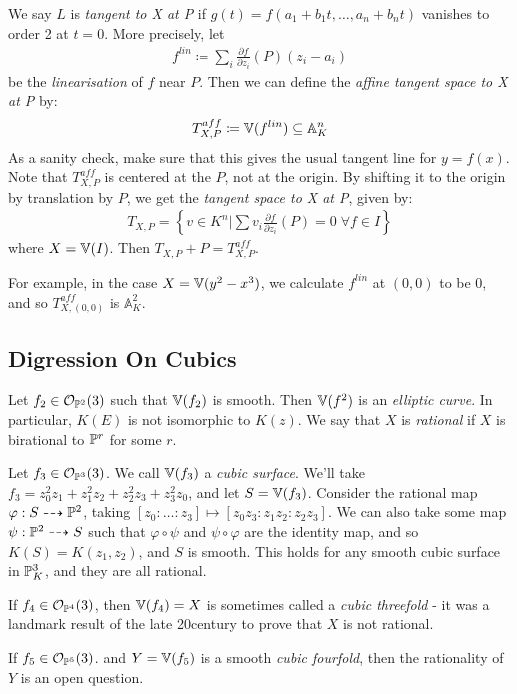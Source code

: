 \documentclass[10pt,a4paper,rgb]{article}
\newcommand{\A}{\mathbb{A}}
\begin{document}
We say $L$ is \emph{tangent to X at P} if $g(t) = f(a_1+b_1t, \ldots, a_n+b_nt)$ vanishes to order 2 at $t=0$. More precisely, let
\begin{align*}
f^{lin} \coloneqq \sum_i \frac{\partial f}{\partial z_i}(P)(z_i-a_i)
\end{align*}
be the \emph{linearisation} of $f$ near $P$. Then we can define the \emph{affine tangent space to X at P} by:
\begin{align*}
T_{X,P}^{aff} \coloneqq \V(f^{lin}) \subseteq \A_K^n
\end{align*}
As a sanity check, make sure that this gives the usual tangent line for $y=f(x)$. Note that $T^{aff}_{X,P}$ is centered at the $P$, not at the origin. By shifting it to the origin by translation by $P$, we get the \emph{tangent space to X at P}, given by:
\begin{align*}
T_{X,P}  = \left\{v \in K^n | \sum v_i \frac{\partial f}{\partial z_i}(P) = 0 \;\forall f \in I\right\}
\end{align*}
where $X = \V(I)$. Then $T_{X,P} + P = T_{X,P}^{aff}$.

For example, in the case $X = \V(y^2-x^3)$, we calculate $f^{lin}$ at $(0,0)$ to be $0$, and so $T_{X, (0,0)}^{aff}$ is $\A^2_K$.

\subsection{Digression On Cubics}
Let $f_2 \in \mathcal{O}_{\P^2}(3)$ such that $\V(f_2)$ is smooth. Then $\V(f^2)$ is an \emph{elliptic curve}. In particular, $K(E)$ is not isomorphic to $K(z)$. We say that $X$ is \emph{rational} if $X$ is birational to $\P^r$ for some $r$.

Let $f_3 \in \mathcal{O}_{\P^3}(3)$. We call $\V(f_3)$ a \emph{cubic surface}. We'll take $f_3 = z_0^2z_1 + z_1^2z_2 + z_2^2z_3+z_3^2z_0$, and let $S = \V(f_3)$. Consider the rational map $\varphi: S \dashrightarrow \P^2$, taking $[z_0:\ldots:z_3]\mapsto [z_0z_3:z_1z_2:z_2z_3]$. We can also take some map $\psi:\P^2 \dashrightarrow S$ such that $\varphi\circ\psi$ and $\psi \circ\varphi$ are the identity map, and so $K(S) = K(z_1,z_2)$, and $S$ is smooth. This holds for any smooth cubic surface in $\P^3_K$, and they are all rational.

If $f_4 \in \mathcal{O}_{\P^4}(3)$, then $\V(f_4) = X$ is sometimes called a \emph{cubic threefold} - it was a landmark result of the late 20\th century to prove that $X$ is not rational.

If $f_5 \in \mathcal{O}_{\P^5}(3)$. and $Y=\V(f_5)$ is a smooth \emph{cubic fourfold}, then the rationality of $Y$ is an open question.
\end{document}
